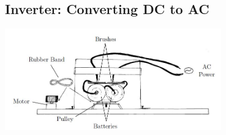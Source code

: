 \subsection{Inverter: Converting DC to AC} \label{sub:inverter}

\begin{center}
\includegraphics[width=0.7\textwidth]{./img/inverter-2.jpg}
\end{center}

